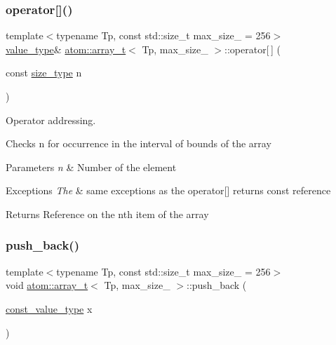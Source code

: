 \subsubsection{\texorpdfstring{operator[]()}{operator[]()}\hspace{0.1cm}{\footnotesize\ttfamily [2/2]}}
{\footnotesize\ttfamily template$<$typename Tp, const std\+::size\+\_\+t max\+\_\+size\+\_\+ = 256$>$ \\
\hyperlink{classatom_1_1array__t_aeb485cd6190dc11ddb8e7f48c09451c4}{value\+\_\+type}\& \hyperlink{classatom_1_1array__t}{atom\+::array\+\_\+t}$<$ Tp, max\+\_\+size\+\_\+ $>$\+::operator\mbox{[}$\,$\mbox{]} (\begin{DoxyParamCaption}\item[{const \hyperlink{classatom_1_1array__t_a8534f23c7f0082698cbd708e1f2e26ff}{size\+\_\+type}}]{n }\end{DoxyParamCaption})\hspace{0.3cm}{\ttfamily [inline]}}



Operator addressing. 

Checks n for occurrence in the interval of bounds of the array 
\begin{DoxyParams}{Parameters}
{\em n} & Number of the element \\
\hline
\end{DoxyParams}

\begin{DoxyExceptions}{Exceptions}
{\em The} & same exceptions as the operator\mbox{[}\mbox{]} returns const reference \\
\hline
\end{DoxyExceptions}
\begin{DoxyReturn}{Returns}
Reference on the nth item of the array 
\end{DoxyReturn}
\mbox{\label{classatom_1_1array__t_ad53d9e0a290e125927d70c202b04aea4}} 
\subsubsection{\texorpdfstring{push\+\_\+back()}{push\_back()}}
{\footnotesize\ttfamily template$<$typename Tp, const std\+::size\+\_\+t max\+\_\+size\+\_\+ = 256$>$ \\
void \hyperlink{classatom_1_1array__t}{atom\+::array\+\_\+t}$<$ Tp, max\+\_\+size\+\_\+ $>$\+::push\+\_\+back (\begin{DoxyParamCaption}\item[{\hyperlink{classatom_1_1array__t_a9c33ee3fb4e5b4d57c7801a8f69ada14}{const\+\_\+value\+\_\+type}}]{x }\end{DoxyParamCaption})\hspace{0.3cm}{\ttfamily [inline]}}



